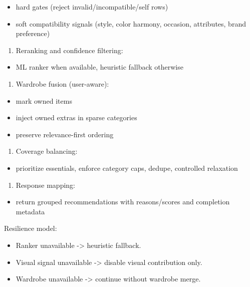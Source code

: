 \documentclass[12pt,a4paper]{report}
\begin{document}
\begin{itemize}
\item hard gates (reject invalid/incompatible/self rows)
\item soft compatibility signals (style, color harmony, occasion, attributes, brand preference)
\end{itemize}
\begin{enumerate}
\item Reranking and confidence filtering:
\end{enumerate}
\begin{itemize}
\item ML ranker when available, heuristic fallback otherwise
\end{itemize}
\begin{enumerate}
\item Wardrobe fusion (user-aware):
\end{enumerate}
\begin{itemize}
\item mark owned items
\item inject owned extras in sparse categories
\item preserve relevance-first ordering
\end{itemize}
\begin{enumerate}
\item Coverage balancing:
\end{enumerate}
\begin{itemize}
\item prioritize essentials, enforce category caps, dedupe, controlled relaxation
\end{itemize}
\begin{enumerate}
\item Response mapping:
\end{enumerate}
\begin{itemize}
\item return grouped recommendations with reasons/scores and completion metadata
\end{itemize}

Resilience model:

\begin{itemize}
\item Ranker unavailable -> heuristic fallback.
\item Visual signal unavailable -> disable visual contribution only.
\item Wardrobe unavailable -> continue without wardrobe merge.
\end{itemize}
\end{document}
